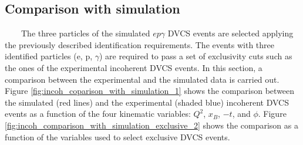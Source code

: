 \subsection{Comparison with simulation}
~~~~The three particles of the simulated $ep\gamma$ DVCS events are selected applying the previously described identification requirements. The events with three identified particles (e, p, $\gamma$) are required to pass a set of exclusivity cuts such as the ones of the experimental incoherent DVCS events. In this section, a comparison between the experimental and the simulated data is carried out.\\

Figure \ref{fig:incoh_coparison_with_simulation_1} shows the comparison between the simulated (red lines) and the experimental (shaded blue) incoherent DVCS events as a function of the four kinematic variables: $Q^{2}$, $x_{B}$, $-t$, and $\phi$. Figure \ref{fig:incoh_comparison_with_simulation_exclusive_2} shows the comparison as a function of the variables used to select exclusive DVCS events.
